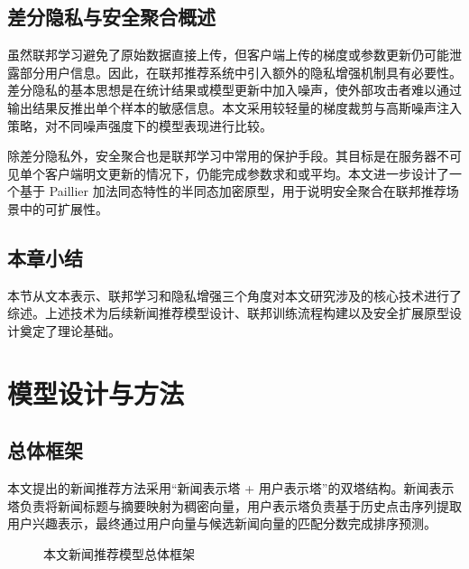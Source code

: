 \documentclass[UTF8,a4paper,12pt]{ctexart}
\numberwithin{equation}{section}
\begin{document}
\subsection{差分隐私与安全聚合概述}
虽然联邦学习避免了原始数据直接上传，但客户端上传的梯度或参数更新仍可能泄露部分用户信息。因此，在联邦推荐系统中引入额外的隐私增强机制具有必要性。差分隐私的基本思想是在统计结果或模型更新中加入噪声，使外部攻击者难以通过输出结果反推出单个样本的敏感信息。本文采用较轻量的梯度裁剪与高斯噪声注入策略，对不同噪声强度下的模型表现进行比较。

除差分隐私外，安全聚合也是联邦学习中常用的保护手段。其目标是在服务器不可见单个客户端明文更新的情况下，仍能完成参数求和或平均。本文进一步设计了一个基于 Paillier 加法同态特性的半同态加密原型，用于说明安全聚合在联邦推荐场景中的可扩展性。

\subsection{本章小结}
本节从文本表示、联邦学习和隐私增强三个角度对本文研究涉及的核心技术进行了综述。上述技术为后续新闻推荐模型设计、联邦训练流程构建以及安全扩展原型设计奠定了理论基础。

\newpage
{}
\section{模型设计与方法}
\subsection{总体框架}
本文提出的新闻推荐方法采用“新闻表示塔 + 用户表示塔”的双塔结构。新闻表示塔负责将新闻标题与摘要映射为稠密向量，用户表示塔负责基于历史点击序列提取用户兴趣表示，最终通过用户向量与候选新闻向量的匹配分数完成排序预测。

\begin{figure}[H]
\centering
{}
\caption{本文新闻推荐模型总体框架}
\end{figure}
\end{document}
